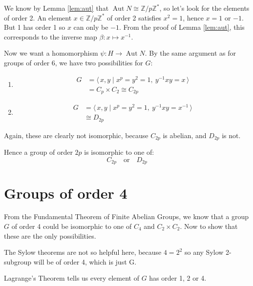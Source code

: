 \documentclass[a4paper, oneside, 12pt, final]{article}
\theoremstyle{definition}
\DeclareMathOperator{\Aut}{Aut}
\newcommand{\Z}{\mathbb{Z}}
\newcommand{\Zn}[1]{\Z/#1\Z}
\begin{document}
We know by Lemma \ref{lem:aut} that \(\Aut{N} \cong \Zn{p}^*\), so let's look for the elements of
order 2.
An element \(x \in \Zn{p}^*\) of order 2 satisfies \(x^2 = 1\), hence \(x = 1\) or \(-1\).
But 1 has order 1 so \(x\) can only be \(-1\).
From the proof of Lemma \ref{lem:aut}, this corresponds to the inverse map \(\beta:x \mapsto
x^{-1}\).

Now we want a homomorphism \(\psi: H \to \Aut{N}\).
By the same argument as for groups of order 6, we have two possibilities for \(G\):

\begin{enumerate}
    \item
        \begin{equation*}
        \begin{aligned}
            G &= \langle\, x, y \mid x^p = y^2 = 1,\ y^{-1}xy = x \,\rangle \\
            &= C_p \times C_2 \cong C_{2p}
        \end{aligned}
        \end{equation*}
    \item
        \begin{equation*}
        \begin{aligned}
            G &= \langle\, x, y \mid x^p = y^2 = 1,\ y^{-1}xy = x^{-1}
            \,\rangle \\
            &\cong D_{2p}
        \end{aligned}
        \end{equation*}
\end{enumerate}

Again, these are clearly not isomorphic, because \(C_{2p}\) is abelian, and \(D_{2p}\) is not.

Hence a group of order \(2p\) is isomorphic to one of:
\[C_{2p} \quad \text{or} \quad D_{2p}\]

\section{Groups of order 4}
From the Fundamental Theorem of Finite Abelian Groups, we know that a group
\(G\) of order 4 could be isomorphic to one of \(C_4\) and \(C_2 \times C_2\).
Now to show that these are the only possibilities.

The Sylow theorems are not so helpful here, because \(4=2^2\) so any Sylow
2-subgroup will be of order 4, which is just G.

Lagrange's Theorem tells us every element of \(G\) has order 1, 2 or 4.
\end{document}
